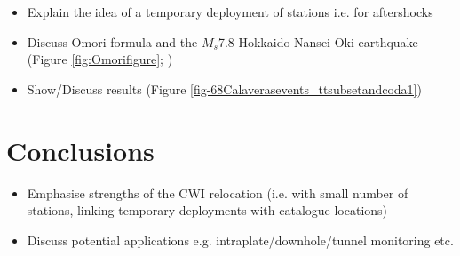 \documentclass[draft,jgrga]{agutex}
\begin{document}
\begin{article}
\begin{itemize}
\item Explain the idea of a temporary deployment of stations i.e. for aftershocks
\item Discuss Omori formula and the $M_s$7.8 Hokkaido-Nansei-Oki earthquake
(Figure \ref{fig:Omorifigure}; \citealp{dr_Utsu95a})
\item Show/Discuss results (Figure \ref{fig-68Calaverasevents_ttsubsetandcoda1})
\end{itemize}

\section{Conclusions}
\begin{itemize}
\item Emphasise strengths of the CWI relocation (i.e. with small number of stations,
linking temporary deployments with catalogue locations)
\item Discuss potential applications e.g. intraplate/downhole/tunnel monitoring etc.
\end{itemize}


%
%
%
%
%
%


\end{article}
\end{document}
